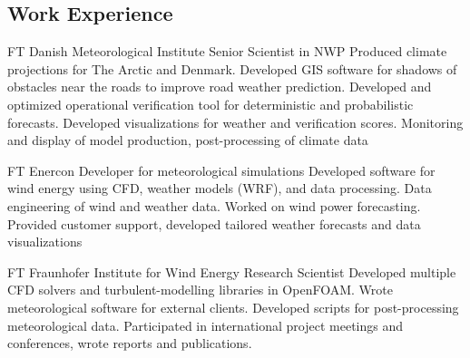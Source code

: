 \documentclass[10pt]{article} %
\begin{document}
\begin{paracol}{2}
\medskip %


\section{Work Experience}





{FT} %
{Danish Meteorological Institute} %
{Senior Scientist in NWP} %
{Produced climate projections for The Arctic and Denmark. Developed GIS software for shadows of obstacles near the roads to improve
road weather prediction. Developed and optimized operational verification tool for deterministic and probabilistic forecasts. Developed
visualizations for weather and verification scores. Monitoring
and display of model production, post-processing of climate data} %


{FT} %
{Enercon} %
{Developer for meteorological simulations} %
{Developed software for wind energy using CFD, weather models (WRF), and data processing. Data engineering
of wind and weather data. Worked on wind power forecasting. Provided customer support, developed
tailored weather forecasts and data visualizations}  %


{FT} %
{Fraunhofer Institute for Wind Energy} %
{Research Scientist} %
{Developed multiple CFD solvers and turbulent-modelling libraries in OpenFOAM. Wrote meteorological software 
for external clients. Developed scripts for post-processing meteorological data. 
Participated in international project meetings and conferences, wrote reports and publications}. %



\end{paracol}
\end{document}
